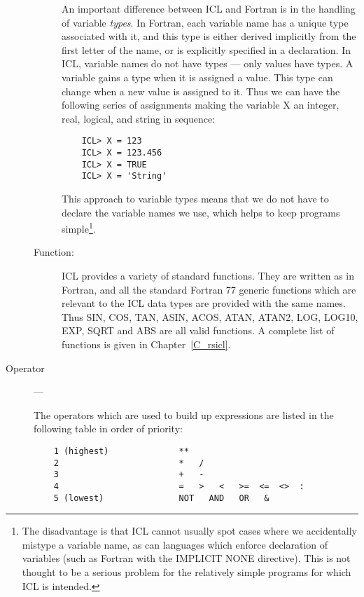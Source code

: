 \begin{description}
\begin{description}
An important difference between ICL and Fortran is in the handling
of variable {\em types}.
In Fortran, each variable name has a unique type associated with it, and this
type is either derived implicitly from the first letter of the name, or is
explicitly specified in a declaration.
In ICL, variable names do not have types --- only values have types.
A variable gains a type when it is assigned a value.
This type can change when a new value is assigned to it.
Thus we can have the following series of assignments making the variable X
an integer, real, logical, and string in sequence:

\begin{small}
\begin{verbatim}
    ICL> X = 123
    ICL> X = 123.456
    ICL> X = TRUE
    ICL> X = 'String'
\end{verbatim}
\end{small}

This approach to variable types means that we do not have to declare the
variable names we use, which helps to keep programs simple\footnote{The
disadvantage is that ICL cannot usually spot cases where we accidentally
mistype a variable name, as can languages which enforce declaration of variables
(such as Fortran with the IMPLICIT NONE directive).
This is not thought to be a serious problem for the relatively simple programs
for which ICL is intended.}.

\item[Function:] \mbox{}

ICL provides a variety of standard functions.
They are written as in Fortran, and all the standard Fortran 77 generic
functions which are relevant to the ICL data types are provided with the same
names.
Thus SIN, COS, TAN, ASIN, ACOS, ATAN, ATAN2, LOG, LOG10, EXP, SQRT and ABS are
all valid functions.
A complete list of functions is given in Chapter~\ref{C_rsicl}.
\end{description}
\item[Operator] ---

The operators which are used to build up expressions are listed in the following
table in order of priority:

\begin{small}
\begin{verbatim}
    1 (highest)              **
    2                        *   /
    3                        +   -
    4                        =   >   <   >=  <=  <>  :
    5 (lowest)               NOT   AND   OR   &
\end{verbatim}
\end{small}


\end{description}
